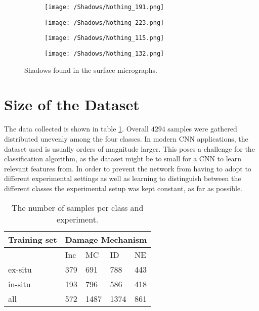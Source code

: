 \begin{figure}[H]
\begin{subfigure}{.24\textwidth}
\texttt{[image: /Shadows/Nothing\_191.png]}
\end{subfigure}
\begin{subfigure}{.24\textwidth}
\texttt{[image: /Shadows/Nothing\_223.png]}
\end{subfigure}
\begin{subfigure}{.24\textwidth}
\texttt{[image: /Shadows/Nothing\_115.png]}
\end{subfigure}
\begin{subfigure}{.24\textwidth}
\texttt{[image: /Shadows/Nothing\_132.png]}
\end{subfigure}
\caption{Shadows found in the surface micrographs.}
\end{figure}

\section{Size of the Dataset}

The data collected is shown in table \ref{tab:Dataset}. Overall $4294$ samples were gathered distributed unevenly among the four classes. In modern CNN applications, the dataset used is usually orders of magnitude larger. This poses a challenge for the classification algorithm, as the dataset might be to small for a CNN to learn relevant features from. In order to prevent the network from having to adopt to different experimental settings as well as learning to distinguish between the different classes the experimental setup was kept constant, as far as possible. 

\begin{table}[H]
\begin{center}
\begin{tabular}{@{} *5l @{}} \toprule[2pt]
Training set &  \multicolumn{4}{c}{Damage Mechanism}   \\\midrule
 & Inc & MC & ID & NE   \\ 
ex-situ  & 379 & 691 & 788 & 443\\ 
in-situ  & 193 & 796 & 586 & 418 \\ \bottomrule
all  & 572 & 1487 & 1374 & 861\\\bottomrule[2pt]

\end{tabular}
\end{center}
\caption{The number of samples per class and experiment.}
\label{tab:Dataset}
\end{table}








